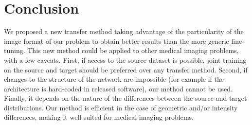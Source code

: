 \section{Conclusion}
\label{sec:transfer_conclusion}

We proposed a new transfer method taking advantage of the particularity of the image format of our problem to obtain better results than the more generic fine-tuning. This new method could be applied to other medical imaging problems, with a few caveats. First, if access to the source dataset is possible, joint training on the source and target should be preferred over any transfer method. Second, if changes to the structure of the network are impossible (for example if the architecture is hard-coded in released software), our method cannot be used. Finally, it depends on the nature of the differences between the source and target distributions. Our method is efficient in the case of geometric and/or intensity differences, making it well suited for medical imaging problems.
